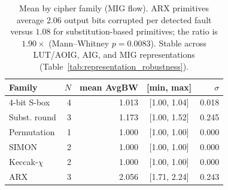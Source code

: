 \begin{table}[tbp]
  \caption{Mean \AvgBW{} by cipher family (MIG flow). ARX primitives average $2.06$ output bits corrupted per detected fault versus $1.08$ for substitution-based primitives; the ratio is $1.90\times$ (Mann--Whitney $p=0.0083$). Stable across LUT/AOIG, AIG, and MIG representations (Table~\ref{tab:representation_robustness}).}
  \label{tab:arx-dichotomy}
  \centering
  \small
  \begin{tabular}{lrrcr}
    \toprule
    Family & $N$ & mean AvgBW & [min, max] & $\sigma$ \\
    \midrule
4-bit S-box & 4 & 1.013 & [1.00, 1.04] & 0.018 \\
    Subst. round & 3 & 1.173 & [1.00, 1.52] & 0.245 \\
    Permutation & 1 & 1.000 & [1.00, 1.00] & 0.000 \\
    SIMON & 2 & 1.000 & [1.00, 1.00] & 0.000 \\
    Keccak-$\chi$ & 2 & 1.000 & [1.00, 1.00] & 0.000 \\
    ARX & 3 & 2.056 & [1.71, 2.24] & 0.243 \\
    \bottomrule
  \end{tabular}
\end{table}
